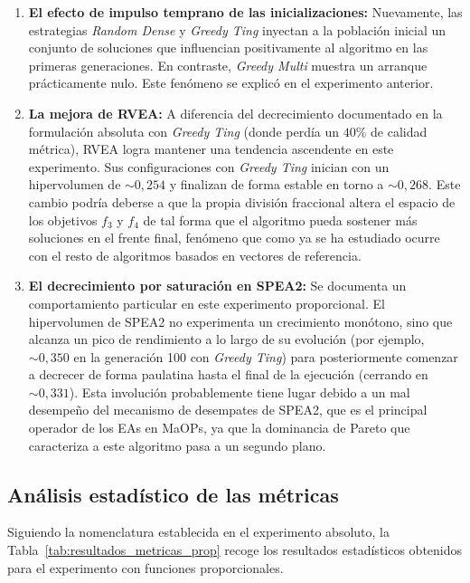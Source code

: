 \begin{enumerate}
    \item \textbf{El efecto de impulso temprano de las inicializaciones:} Nuevamente, las estrategias \textit{Random Dense} y \textit{Greedy Ting} inyectan a la población inicial un conjunto de soluciones que influencian positivamente al algoritmo en las primeras generaciones. En contraste, \textit{Greedy Multi} muestra un arranque prácticamente nulo. Este fenómeno se explicó en el experimento anterior.
    \item \textbf{La mejora de RVEA:} A diferencia del decrecimiento documentado en la formulación absoluta con \textit{Greedy Ting} (donde perdía un $40\%$ de calidad métrica), RVEA logra mantener una tendencia ascendente en este experimento. Sus configuraciones con \textit{Greedy Ting} inician con un hipervolumen de $\sim 0{,}254$ y finalizan de forma estable en torno a $\sim 0{,}268$. Este cambio podría deberse a que la propia división fraccional altera el espacio de los objetivos $f_3$ y $f_4$ de tal forma que el algoritmo pueda sostener más soluciones en el frente final, fenómeno que como ya se ha estudiado ocurre con el resto de algoritmos basados en vectores de referencia.
    \item \textbf{El decrecimiento por saturación en SPEA2:} Se documenta un comportamiento particular en este experimento proporcional. El hipervolumen de SPEA2 no experimenta un crecimiento monótono, sino que alcanza un pico de rendimiento a lo largo de su evolución (por ejemplo, $\sim 0{,}350$ en la generación 100 con \textit{Greedy Ting}) para posteriormente comenzar a decrecer de forma paulatina hasta el final de la ejecución (cerrando en $\sim 0{,}331$). Esta involución probablemente tiene lugar debido a un mal desempeño del mecanismo de desempates de SPEA2, que es el principal operador de los EAs en MaOPs, ya que la dominancia de Pareto que caracteriza a este algoritmo pasa a un segundo plano.
\end{enumerate}

\subsection{Análisis estadístico de las métricas}

Siguiendo la nomenclatura establecida en el experimento absoluto, la Tabla~\ref{tab:resultados_metricas_prop} recoge los resultados estadísticos obtenidos para el experimento con funciones proporcionales.

